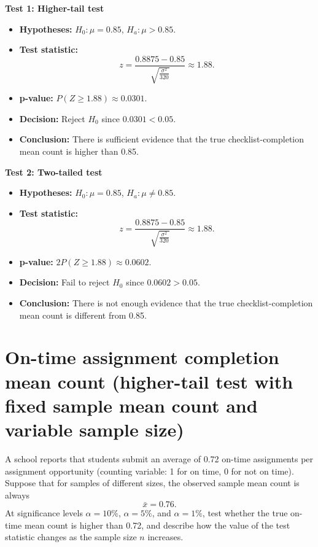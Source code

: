 \textbf{Test 1: Higher-tail test}

\begin{itemize}
	\item \textbf{Hypotheses:} \(H_0\colon \mu=0.85\), \(H_a\colon \mu>0.85\).
	\item \textbf{Test statistic:}
	\[
	z=\frac{0.8875-0.85}{\sqrt{\frac{\sigma^2}{320}}}\approx 1.88.
	\]
	\item \textbf{p-value:} \(P(Z\ge 1.88)\approx 0.0301\).
	\item \textbf{Decision:} Reject \(H_0\) since \(0.0301<0.05\).
	\item \textbf{Conclusion:} There is sufficient evidence that the true checklist-completion mean count is higher than 0.85.
\end{itemize}

\begin{center}
\end{center}


\textbf{Test 2: Two-tailed test}

\begin{itemize}
	\item \textbf{Hypotheses:} \(H_0\colon \mu=0.85\), \(H_a\colon \mu\ne0.85\).
	\item \textbf{Test statistic:}
	\[
	z=\frac{0.8875-0.85}{\sqrt{\frac{\sigma^2}{320}}}\approx 1.88.
	\]
	\item \textbf{p-value:} \(2P(Z\ge 1.88)\approx 0.0602\).
	\item \textbf{Decision:} Fail to reject \(H_0\) since \(0.0602>0.05\).
	\item \textbf{Conclusion:} There is not enough evidence that the true checklist-completion mean count is different from 0.85.
\end{itemize}

\begin{center}
\end{center}


\section{On-time assignment completion mean count (higher-tail test with fixed sample mean count and variable sample size)}
A school reports that students submit an average of 0.72 on-time assignments per assignment opportunity (counting variable: 1 for on time, 0 for not on time). Suppose that for samples of different sizes, the observed sample mean count is always
\[
\bar x=0.76.
\]
At significance levels \(\alpha=10\%\), \(\alpha=5\%\), and \(\alpha=1\%\), test whether the true on-time mean count is higher than 0.72, and describe how the value of the test statistic changes as the sample size \(n\) increases.

